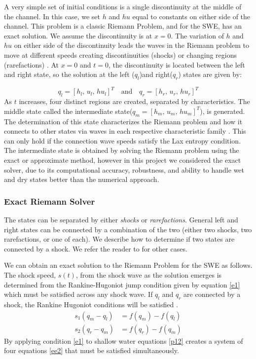 \documentclass[12pt,a4paper]{article}
\begin{document}
 A very simple set of initial conditions is a single discontinuity at the middle of the channel.  In this case, we set $h$ and $hu$ equal to constants on either side of the channel.  This problem is a classic Riemann Problem, and for the SWE, has an exact solution.  We assume the discontinuity is at $x = 0$. 
 The variation of $h$ and $hu$ on either side of the discontinuity leads the waves in the Riemann problem to move at different speeds creating discontinuities (shocks) or changing regions (rarefactions) \citep{leveque2002finite}.  At $x = 0$ and $t = 0$,   the discontinuity is located between the left and right state, so the solution at the left ($q_{l}$)and right($q_{r}$) states are given by: 

\begin{equation}
	q_{l} = [ h_l, \, u_l, \, hu_l]^T \quad \text{and} \quad  q_{r} = [ h_r, \, u_r, \, hu_r]^T
		\label{ic}
\end{equation}
 As $t$ increases, four distinct regions are created, separated by characteristics. 
 The middle state called the intermediate state($q_{m} = [ h_m, \, u_m, \, hu_m]^T$), is generated.  The determination of this state characterizes the Riemann problem and how it connects to other states via waves in each respective characteristic family \citep{ba-le-mi-ro:2003}.  This can only hold if the connection wave speeds satisfy the Lax entropy condition.  The intermediate state is obtained by solving the Riemann problem using the exact  or approximate method, however in this project we considered the exact solver, due  to its  computational accuracy, robustness, and  ability to handle wet and dry states better than the numerical approach.
 
 
 \subsubsection{Exact Riemann Solver }
 The states  can be separated by either {\em shocks} or {\em rarefactions}. General left and right states can be connected by a combination of the two (either two shocks, two rarefactions, or one of each).  We describe how to determine if two states are connected by a shock.  We refer the reader to  \cite{leveque2002finite} for other cases. 
 
 We can obtain an exact solution to the Riemann Problem for the SWE as follows. 
 The shock speed, $s(t)$,  from the shock wave as the solution emerges is determined from the Rankine-Hugoniot jump condition given by equation \eqref{e1}  which must be satisfied across any shock wave.  If $q_l$ and $q_r$ are connected by a shock, the Rankine Hugoniot conditions will be satisfied \citep{ma-ah-be-ca-ge-ha-ke-le-le:2016}. 
 \begin{equation}
 	\begin{aligned}
 		s_1(q_{m} - q_{l}) & = f(q_{m}) - f(q_{l}) \\
 		s_2(q_{r} - q_{m}) & = f(q_{r}) - f(q_{m})
 	\end{aligned}
 	\label{e1}
 \end{equation}
 By applying condition  \eqref{e1} to shallow water equations \eqref{p12}  creates a system of four equations \eqref{ee2} that must be satisfied simultaneously. 
 
\end{document}
